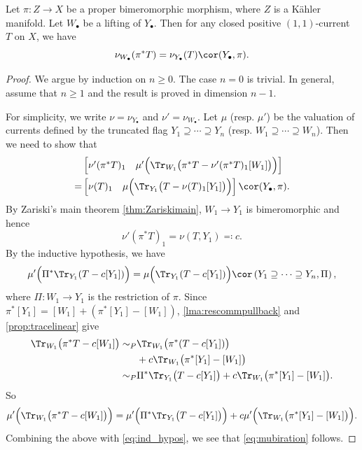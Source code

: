 \begin{proposition}\label{prop:cormatrix}
    Let $\pi\colon Z\rightarrow X$ be a proper bimeromorphic morphism, where $Z$ is a Kähler manifold. Let $W_{\bullet}$ be a lifting of $Y_{\bullet}$. Then for any closed positive $(1,1)$-current $T$ on $X$, we have
    \begin{equation}
    \nu_{W_{\bullet}}(\pi^*T)= \nu_{Y_{\bullet}}(T)\cor(Y_{\bullet},\pi).
    \end{equation}
\end{proposition}
\begin{proof}
    We argue by induction on $n\geq 0$. The case $n=0$ is trivial. In general, assume that $n\geq 1$ and the result is proved in dimension $n-1$.

    For simplicity, we write $\nu=\nu_{Y_{\bullet}}$ and $\nu'=\nu_{W_{\bullet}}$.
    Let $\mu$ (resp. $\mu'$) be the valuation of currents defined by the truncated flag $Y_1\supseteq\cdots \supseteq Y_n$ (resp. $W_1\supseteq\cdots \supseteq W_n$). Then we need to show that
    \begin{equation}\label{eq:mubiration}
    \begin{split}
    &\begin{bmatrix}
     \nu'(\pi^*T)_1 &
     \mu'\Bigl( \Tr_{W_1}\bigl(\pi^*T-\nu'(\pi^*T)_1[W_1]\bigr)\Bigr)
    \end{bmatrix}\\
    =&
    \begin{bmatrix}
        \nu(T)_1 &
        \mu\Bigl(\Tr_{Y_1}\bigl(T-\nu(T)_1[Y_1]\bigr)\Bigr)
    \end{bmatrix}\cor(Y_{\bullet},\pi).
    \end{split}
    \end{equation}
    By Zariski's main theorem \cref{thm:Zariskimain}, $W_1\to Y_1$ is bimeromorphic and hence
    \[
        \nu'(\pi^*T)_1=\nu(T,Y_1)\eqqcolon c.
    \]
    By the inductive hypothesis, we have
    \begin{equation}\label{eq:ind_hypos}
        \mu'\Bigl(\Pi^{*} \Tr_{Y_1}(T-c[Y_1])\Bigr)=\mu\Bigl(\Tr_{Y_1}(T-c[Y_1])\Bigr)\cor\left(Y_1\supseteq \cdots \supseteq Y_n,\Pi\right),
    \end{equation}
    where $\Pi\colon W_1\rightarrow Y_1$ is the restriction of $\pi$. Since $\pi^*[Y_1]=[W_1]+(\pi^*[Y_1]-[W_1])$, \cref{lma:rescommpullback} and \cref{prop:tracelinear} give
    \[
    \begin{split}
        \Tr_{W_1}\bigl(\pi^*T-c[W_1]\bigr)\sim_P&\Tr_{W_1}\bigl(\pi^*(T-c[Y_1])\bigr)\\
        &+c \Tr_{W_1}\bigl(\pi^*[Y_1]-[W_1]\bigr)\\
        \sim_P&\Pi^{*}\Tr_{Y_1}\bigl(T-c[Y_1]\bigr)+c \Tr_{W_1}\bigl(\pi^*[Y_1]-[W_1]\bigr).
    \end{split}
    \]
    So
    \[
    \mu'\Bigl(\Tr_{W_1}\bigl(\pi^*T-c[W_1]\bigr)\Bigr)=\mu'\Bigl(\Pi^{*}\Tr_{Y_1}\bigl(T-c[Y_1]\bigr)\Bigr)+c\mu'\Bigl(\Tr_{W_1}\bigl(\pi^*[Y_1]-[W_1]\bigr)\Bigr).
    \]
Combining the above with \eqref{eq:ind_hypos}, we see that \eqref{eq:mubiration} follows.
\end{proof}

